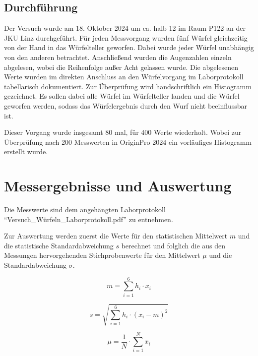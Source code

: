 \documentclass[a4paper,12pt]{article}
\begin{document}
\subsection{Durchführung}
Der Versuch wurde am 18. Oktober 2024 um ca. halb 12 im Raum P122 an der JKU Linz durchgeführt.
Für jeden Messvorgang wurden fünf Würfel gleichzeitig von der Hand in das Würfelteller geworfen. Dabei wurde jeder Würfel 
unabhängig von den anderen betrachtet. Anschließend wurden die Augenzahlen einzeln abgelesen, wobei die Reihenfolge außer 
Acht gelassen wurde. Die abgelesenen Werte wurden im direkten Anschluss an den Würfelvorgang im Laborprotokoll tabellarisch 
dokumentiert. Zur Überprüfung wird handschriftlich ein Histogramm gezeichnet. Es sollen dabei alle Würfel im Würfelteller 
landen und die Würfel geworfen werden, sodass das Würfelergebnis durch den Wurf nicht beeinflussbar ist.

Dieser Vorgang wurde insgesamt 80 mal, für 400 Werte wiederholt. Wobei zur Überprüfung nach 200 Messwerten in OriginPro 
2024 ein vorläufiges Histogramm erstellt wurde. 

\section{Messergebnisse und Auswertung}
Die Messwerte sind dem angehängten Laborprotokoll ``Versuch\_Würfeln\_Laborprotokoll.pdf'' zu entnehmen.


Zur Auswertung werden zuerst die Werte für den statistischen Mittelwert $m$ und die statistische Standardabweichung 
$s$ berechnet und folglich die aus den Messungen hervorgehenden Stichprobenwerte für den Mittelwert $\mu$ und die 
Standardabweichung $\sigma$.

\begin{equation}
    m = \sum_{i=1}^{6} h_i \cdot x_i
\end{equation}

\begin{equation}
    s = \sqrt{\sum_{i=1}^{6} h_i\cdot(x_i - m)^2}
\end{equation}

\begin{equation}
    \mu = \frac{1}{N}\cdot \sum_{i=1}^{N} x_i
\end{equation}
\end{document}

